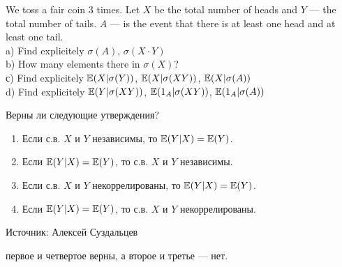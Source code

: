 \begin{problem}
We toss a fair coin 3 times. Let $X$ be the total number of heads and $Y$ — the total number of tails. $A$ — is the event that there is at least one head and at least one tail. \\
a) Find explicitely $\sigma(A)$, $\sigma(X\cdot Y)$ \\
b) How many elements there in $\sigma(X)$? \\
с) Find explicitely $\mathbb{E}(X|\sigma(Y))$, $\mathbb{E}(X|\sigma(XY))$, $\mathbb{E}(X|\sigma(A))$ \\
d) Find explicitely $\mathbb{E}(Y|\sigma(XY))$, $\mathbb{E}(1_{A}|\sigma(XY))$, $\mathbb{E}(1_{A}|\sigma(A))$

\begin{sol}

\end{sol}
\end{problem}

\begin{problem}
Верны ли следующие утверждения?
\begin{enumerate}
  \item Если с.в. $X$ и $Y$ независимы, то $\mathbb{E}(Y|X)=\mathbb{E}(Y)$.
  \item Если $\mathbb{E}(Y|X)=\mathbb{E}(Y)$, то с.в. $X$ и $Y$ независимы.
  \item Если с.в. $X$ и $Y$ некоррелированы, то $\mathbb{E}(Y|X)=\mathbb{E}(Y)$.
  \item Если $\mathbb{E}(Y|X)=\mathbb{E}(Y)$, то с.в. $X$ и $Y$ некоррелированы.
\end{enumerate}

Источник: Алексей Суздальцев

\begin{sol}
 первое и четвертое верны, а второе и третье — нет.
\end{sol}
\end{problem}

